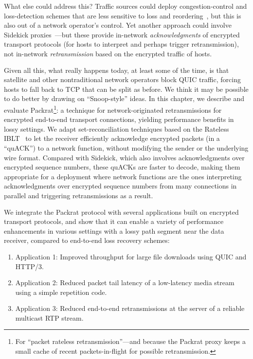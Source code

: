 What else could address this? Traffic sources could deploy
congestion-control and loss-detection schemes that are less sensitive
to loss and reordering~\cite{rfc8985}, but this is also out of a
network operator's control. Yet another approach could involve
Sidekick proxies~\cite{yuan2024sidekick}---but these provide
in-network \emph{acknowledgments} of encrypted transport protocols
(for hosts to interpret and perhaps trigger retransmission), not
in-network \emph{retransmission} based on the encrypted traffic of
hosts.

Given all this, what really happens today, at least some
of the time, is that satellite and other nontraditional network
operators block QUIC traffic, forcing hosts to fall back to TCP that
can be split as before. We think it may be possible to do better by drawing on ``Snoop-style''
ideas. In this chapter, we describe and evaluate Packrat\footnote{For
``packet rateless retransmission''---and because the Packrat proxy keeps
a small cache of recent packets-in-flight for possible
retransmission.}: a technique for network-originated retransmissions
for encrypted end-to-end transport connections, yielding performance
benefits in lossy settings. We adapt set-reconciliation techniques
based on the Rateless IBLT~\cite{yang2024practical} to let the
receiver efficiently acknowledge encrypted packets (in a ``quACK'') to a network
function, without modifying the sender or the underlying wire
format. Compared with Sidekick, which also involves
acknowledgments over encrypted sequence numbers, these quACKs
are faster to decode, making them appropriate for a deployment
where network functions are the ones interpreting acknowledgments over
encrypted sequence numbers from many connections in parallel and
triggering retransmissions as a result.

We integrate the Packrat protocol with several applications built on encrypted
transport protocols, and show that it can enable a variety of performance
enhancements in various settings with a lossy path segment near the data receiver,
compared to end-to-end loss recovery schemes:

\begin{enumerate}[noitemsep]
\item Application 1: Improved throughput for large file downloads using QUIC and HTTP/3.
\item Application 2: Reduced packet tail latency of a low-latency media stream using a simple repetition code.
\item Application 3: Reduced end-to-end retransmissions at the server of a reliable multicast RTP stream.
\end{enumerate}

